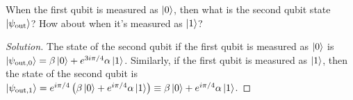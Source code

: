 \begin{solution}[label=ques:3d]
  \begin{question}
    When the first qubit is measured as $\ket{0}$, then what is the second qubit state $\ket{\psi_\text{out}}$? How about when it's measured as $\ket{1}$?
  \end{question}
  \tcblower{}
  \begin{proof}[Solution]
    The state of the second qubit if the first qubit is measured as $\ket{0}$ is $\ket{\psi_{\text{out},0}} = \beta\ket{0} + e^{3i\pi/4}\alpha\ket{1}$. Similarly, if the first qubit is measured as $\ket{1}$, then the state of the second qubit is $\ket{\psi_{\text{out},1}} = e^{i\pi/4}\left(\beta\ket{0} + e^{i\pi/4}\alpha\ket{1}\right) \equiv \beta\ket{0} + e^{i\pi/4}\alpha\ket{1}$.
  \end{proof}
\end{solution}

